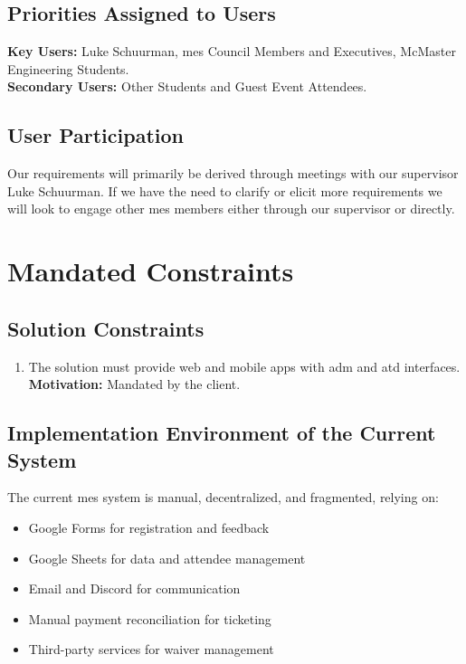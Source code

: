 \documentclass[12pt]{article}
\newcommand{\lips}{\textit{Insert your content here.}}
\begin{document}
\subsection{Priorities Assigned to Users}
\textbf{Key Users:} Luke Schuurman, \gls{mes} Council Members and Executives, McMaster Engineering Students. \\
\textbf{Secondary Users:} Other Students and Guest Event Attendees.
\subsection{User Participation}
Our requirements will primarily be derived through meetings with our supervisor Luke Schuurman. If we have the need to
clarify or elicit more requirements we will look to engage other \gls{mes} members either through our supervisor or
directly.


\section{Mandated Constraints}
\subsection{Solution Constraints}
\begin{enumerate}[align=left,
  leftmargin=*,
  labelsep=1em,
  itemindent=0em,
  label=\bfseries SOC-\arabic*:]
  \item The solution must provide web and mobile apps with \gls{adm} and \gls{atd} interfaces.\\[2mm]
    {\bf Motivation:} Mandated by the client.
\end{enumerate}

\subsection{Implementation Environment of the Current System}
The current \gls{mes} system is manual, decentralized, and fragmented, relying on:
\begin{itemize}
  \item Google Forms for registration and feedback
  \item Google Sheets for data and attendee management
  \item Email and Discord for communication
  \item Manual payment reconciliation for ticketing
  \item Third-party services for waiver management
\end{itemize}
\end{document}
